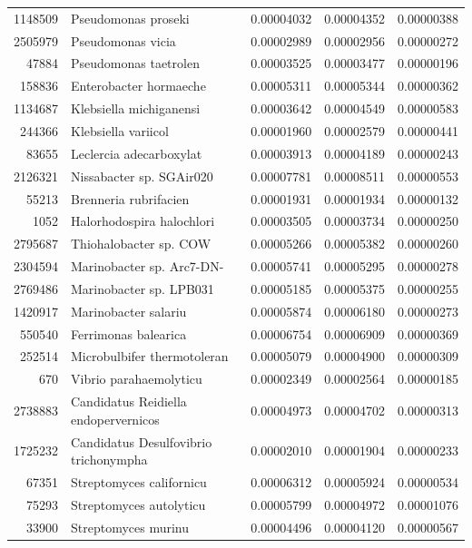 \begin{table}[ht]
\begin{tabular}{rlrrr}
  1148509 & Pseudomonas proseki & 0.00004032 & 0.00004352 & 0.00000388 \\ 
  2505979 & Pseudomonas vicia & 0.00002989 & 0.00002956 & 0.00000272 \\ 
  47884 & Pseudomonas taetrolen & 0.00003525 & 0.00003477 & 0.00000196 \\ 
  158836 & Enterobacter hormaeche & 0.00005311 & 0.00005344 & 0.00000362 \\ 
  1134687 & Klebsiella michiganensi & 0.00003642 & 0.00004549 & 0.00000583 \\ 
  244366 & Klebsiella variicol & 0.00001960 & 0.00002579 & 0.00000441 \\ 
  83655 & Leclercia adecarboxylat & 0.00003913 & 0.00004189 & 0.00000243 \\ 
  2126321 & Nissabacter sp. SGAir020 & 0.00007781 & 0.00008511 & 0.00000553 \\ 
  55213 & Brenneria rubrifacien & 0.00001931 & 0.00001934 & 0.00000132 \\ 
  1052 & Halorhodospira halochlori & 0.00003505 & 0.00003734 & 0.00000250 \\ 
  2795687 & Thiohalobacter sp. COW & 0.00005266 & 0.00005382 & 0.00000260 \\ 
  2304594 & Marinobacter sp. Arc7-DN- & 0.00005741 & 0.00005295 & 0.00000278 \\ 
  2769486 & Marinobacter sp. LPB031 & 0.00005185 & 0.00005375 & 0.00000255 \\ 
  1420917 & Marinobacter salariu & 0.00005874 & 0.00006180 & 0.00000273 \\ 
  550540 & Ferrimonas balearica & 0.00006754 & 0.00006909 & 0.00000369 \\ 
  252514 & Microbulbifer thermotoleran & 0.00005079 & 0.00004900 & 0.00000309 \\ 
  670 & Vibrio parahaemolyticu & 0.00002349 & 0.00002564 & 0.00000185 \\ 
  2738883 & Candidatus Reidiella endopervernicos & 0.00004973 & 0.00004702 & 0.00000313 \\ 
  1725232 & Candidatus Desulfovibrio trichonympha & 0.00002010 & 0.00001904 & 0.00000233 \\ 
  67351 & Streptomyces californicu & 0.00006312 & 0.00005924 & 0.00000534 \\ 
  75293 & Streptomyces autolyticu & 0.00005799 & 0.00004972 & 0.00001076 \\ 
  33900 & Streptomyces murinu & 0.00004496 & 0.00004120 & 0.00000567 \\ 

\end{tabular}
\end{table}
